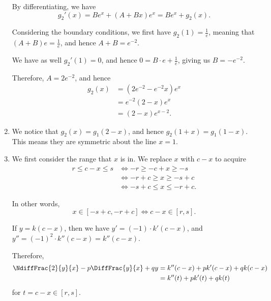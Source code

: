 \begin{enumerate}
          By differentiating, we have
          \[
              g_2'(x) = B e^x + (A + Bx) e^x = B e^x + g_2(x).
          \]

          Considering the boundary conditions, we first have \(g_2(1) = \frac{1}{e}\), meaning that \((A + B) e = \frac{1}{e}\), and hence \(A + B = e^{-2}\).

          We have as well \(g_2'(1) = 0\), and hence \(0 = B \cdot e + \frac{1}{e}\), giving us \(B = - e^{-2}\).

          Therefore,  \(A = 2 e^{-2}\), and hence
          \begin{align*}
              g_2(x) & = \left(2 e^{-2} - e^{-2} x\right) e^x \\
                     & = e^{-2} (2 - x) e^x                   \\
                     & = (2 - x) e^{x - 2}.
          \end{align*}

    \item We notice that \(g_2(x) = g_1(2 - x)\), and hence \(g_2 (1 + x) = g_1 (1 - x)\). This means they are symmetric about the line \(x = 1\).

    \item We first consider the range that \(x\) is in. We replace \(x\) with \(c - x\) to acquire
          \begin{align*}
              r \leq c - x \leq s & \iff -r \geq -c + x \geq -s     \\
                                  & \iff -r + c \geq x \geq -s + c  \\
                                  & \iff -s + c \leq x \leq -r + c.
          \end{align*}

          In other words,
          \[
              x \in [-s + c, -r + c] \iff c - x \in [r, s].
          \]

          If \(y = k(c - x)\), then we have \(y' = (-1) \cdot k'(c - x)\), and \(y'' = (-1)^2 \cdot k''(c - x) = k''(c - x)\).

          Therefore,
          \begin{align*}
              \NdiffFrac{2}{y}{x} - p \DiffFrac{y}{x} + qy & = k''(c - x) + p k'(c - x) + q k (c - x) \\
                                                           & = k''(t) + p k'(t) + q k(t)
          \end{align*}
          for \(t = c - x \in [r, s]\).


\end{enumerate}
